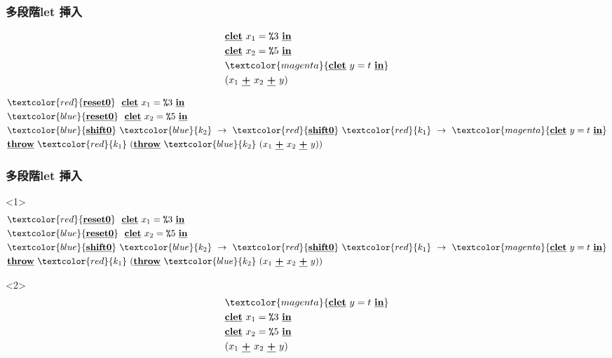 \documentclass[dvipdfmx,cjk,xcolor=dvipsnames,envcountsect,notheorems,12pt]{beamer}
\newcommand\cResetz{\underline{\textbf{reset0}}}
\newcommand\cShiftz{\underline{\textbf{shift0}}}
\newcommand\cThrow{\underline{\textbf{throw}}}
\newcommand\cPlus{\underline{\textbf{+}}}
\newcommand\cLet{\underline{\textbf{clet}}}
\newcommand\cIn{\underline{\textbf{in}}}
\newcommand\csp[1]{\texttt{\%}{#1}}
\newcommand\red[1]{\textcolor{red}{#1}}
\newcommand\magenta[1]{\textcolor{magenta}{#1}}
\newcommand\blue[1]{\textcolor{blue}{#1}}
\theoremstyle{definition}
\begin{document}
\begin{frame}[fragile]
  \frametitle{多段階let 挿入}
  \begin{align*}
    & \cLet~x_1=\csp{3}~\cIn \\
    & \cLet~x_2=\csp{5}~\cIn \\
    & \magenta{\cLet~y=t~\cIn} \\
    & (x_1~\cPlus~x_2~\cPlus~y)
  \end{align*}

  \pause

  \begin{align*}
    & \red{\cResetz} ~~\cLet~x_1=\csp{3}~\cIn \\
    & \blue{\cResetz} ~~\cLet~x_2=\csp{5}~\cIn \\
    & \blue{\cShiftz}~\blue{k_2}~\to~ \red{\cShiftz}~\red{k_1}~\to~ \magenta{\cLet~y=t~\cIn} \\
    & \cThrow~\red{k_1}~(\cThrow~\blue{k_2}~(x_1~\cPlus~x_2~\cPlus~y))
  \end{align*}
\end{frame}

\begin{frame}[fragile]
  \frametitle{多段階let 挿入}
  \begin{onlyenv}<1>
    \begin{align*}
      & \red{\cResetz} ~~\cLet~x_1=\csp{3}~\cIn \\
      & \blue{\cResetz} ~~\cLet~x_2=\csp{5}~\cIn \\
      & \blue{\cShiftz}~\blue{k_2}~\to~ \red{\cShiftz}~\red{k_1}~\to~ \magenta{\cLet~y=t~\cIn} \\
      & \cThrow~\red{k_1}~(\cThrow~\blue{k_2}~(x_1~\cPlus~x_2~\cPlus~y))
    \end{align*}
  \end{onlyenv}

  \begin{onlyenv}<2>
    \begin{align*}
      & \magenta{\cLet~y=t~\cIn} \\
      & \cLet~x_1=\csp{3}~\cIn \\
      & \cLet~x_2=\csp{5}~\cIn \\
      & (x_1~\cPlus~x_2~\cPlus~y)
    \end{align*}
  \end{onlyenv}
\end{frame}
\end{document}
